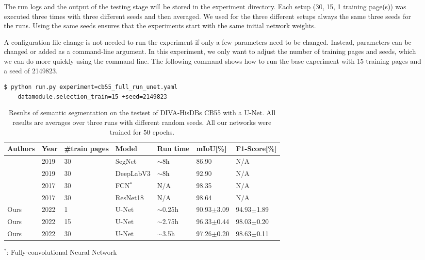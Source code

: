 \documentclass[runningheads]{llncs}
\begin{document}
The run logs and the output of the testing stage will be stored in the experiment directory.
Each setup (30, 15, 1 training page(s)) was executed three times with three different seeds and then averaged.
We used for the three different setups always the same three seeds for the runs.
Using the same seeds ensures that the experiments start with the same initial network weights.


A configuration file change is not needed to run the experiment if only a few parameters need to be changed. Instead, parameters can be changed or added as a command-line argument. 
In this experiment, we only want to adjust the number of training pages and seeds, which we can do more quickly using the command line. 
The following command shows how to run the base experiment with 15 training pages and a seed of 2149823.
\begin{lstlisting}
$ python run.py experiment=cb55_full_run_unet.yaml 
    datamodule.selection_train=15 +seed=2149823
\end{lstlisting}

\begin{table}[ht]
    \caption{Results of semantic segmentation on the testset of DIVA-HisDBs CB55 with a U-Net. All results are averages over three runs with different random seeds. All our networks were trained for 50 epochs.}
    \label{tab:segmentation_results}
    \begin{tabular}{ P{0.09\textwidth} P{0.09\textwidth} P{0.16\textwidth} P{0.15\textwidth} P{0.15\textwidth} P{0.15\textwidth} P{0.14\textwidth}}
        \hline
        Authors & Year & \#train pages & Model & Run time & \ac{mIoU}[\%] & F1-Score[\%] \\
        \hline
\cite{studerComprehensiveStudyImageNet2019a} & 2019 & 30 & SegNet  & $\sim$8h    & 86.90 & N/A\\
        \cite{studerComprehensiveStudyImageNet2019a} & 2019 & 30 & DeepLabV3  & $\sim$8h & 92.90 & N/A\\
        \cite{simistiraICDAR2017CompetitionLayout2017} & 2017 & 30 & FCN$^\ast$ & N/A   & 98.35 & N/A\\
        \cite{simistiraICDAR2017CompetitionLayout2017} & 2017 & 30 & ResNet18     & N/A    & 98.64 & N/A\\
        \hline
        Ours & 2022 & 1  & U-Net & $\sim$0.25h & 90.93$\pm$3.09 & 94.93$\pm$1.89\\
        Ours & 2022 & 15 & U-Net & $\sim$2.75h & 96.33$\pm$0.44 & 98.03$\pm$0.20\\
        Ours & 2022 & 30 & U-Net & $\sim$3.5h  & 97.26$\pm$0.20 & 98.63$\pm$0.11\\
        \hline
    \end{tabular}
    $^\ast$: Fully-convolutional Neural Network
\end{table}
\end{document}
